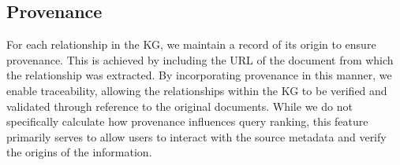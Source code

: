 \subsection{Provenance}

For each relationship in the KG, we maintain a record of its origin to ensure provenance. This is achieved by including the URL of the document from which the relationship was extracted. By incorporating provenance in this manner, we enable traceability, allowing the relationships within the KG to be verified and validated through reference to the original documents. While we do not specifically calculate how provenance influences query ranking, this feature primarily serves to allow users to interact with the source metadata and verify the origins of the information.


